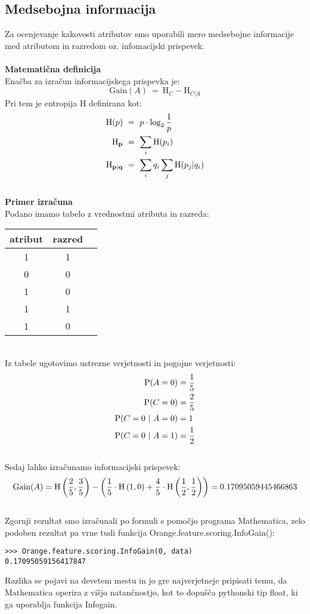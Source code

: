 \documentclass[a4paper,11pt]{article}
\begin{document}
\subsection{Medsebojna informacija}
Za ocenjevanje kakovosti atributov smo uporabili mero medsebojne informacije med atributom in razredom oz. infomacijski prispevek\cite{kononenko}.
\ \\ \ \\
\textbf{Matematična definicija}\ \\
Enačba za izračun informacijskega prispevka je:
$$\mbox{Gain}(A)\ =\ \mbox{H}_C - \mbox{H}_{C|A}$$
Pri tem je entropija H definirana kot:
$$\begin{aligned}
\mbox{H}(p) &\ =\ p \cdot \log_2 {1 \over p}\\
\mbox{H}_\mathbf{p} &\ =\ \sum_{i} \mbox{H}(p_i)\\
\mbox{H}_\mathbf{p|q} &\ =\ \sum_i q_i \sum_{j} \mbox{H}(p_j|q_i)\\
\end{aligned}$$
\newpage\ \\[-20pt]
\textbf{Primer izračuna}\\
Podano imamo tabelo z vrednostmi atributa in razreda:\\
\begin{table}[H]
\begin{center}
\begin{tabular}{ccp{3cm}}
\hline
atribut & razred \\
\hline
1 & 1\\
0 & 0\\
1 & 0\\
1 & 1\\
1 & 0\\
\hline
\end{tabular}
\end{center}
\end{table}\ \\[-20pt]
Iz tabele ugotovimo ustrezne verjetnosti in pogojne verjetnosti:
$$\begin{aligned}
\mbox{P}(A=0)&={1 \over 5}\\
\mbox{P}(C=0)&={2 \over 5}\\
\mbox{P}(C=0\ |\ A=0)&=1\\
\mbox{P}(C=0\ |\ A=1)&={1 \over 2}
\end{aligned}$$\ \\[-12pt]
Sedaj lahko izračunamo informacijski prispevek:
$$\mbox{Gain}(A) = \mbox{H}\left({2 \over 5},{3 \over 5}\right) - \left({1 \over 5} \cdot \mbox{H}\left( 1, 0 \right) + {4 \over 5} \cdot \mbox{H}\left({1 \over 2},{1 \over 2}\right) \right)=0.17095059445466863$$\ \\[-12pt]
Zgornji rezultat smo izračunali po formuli s pomočjo programa Mathematica, zelo podoben rezultat pa vrne tudi funkcija Orange.feature.scoring.InfoGain():
\begin{lstlisting}
>>> Orange.feature.scoring.InfoGain(0, data)
0.17095059156417847
\end{lstlisting}
Razlika se pojavi na devetem mestu in jo gre najverjetneje pripisati temu, da Mathematica operira z višjo natančnostjo, kot to dopušča pythonski tip float, ki ga uporablja funkcija Infogain.
\end{document}
